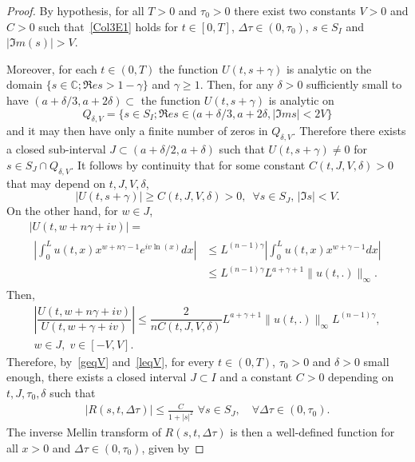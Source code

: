 \documentclass[10pt]{amsart}
\theoremstyle{definition}\newtheorem{defi}[theo]{Definition}\newtheorem{rema}[theo]{Remark}\newtheorem{exam}[theo]{Example}\newtheorem{exem}[theo]{Example}\newtheorem{nota}[theo]{Notation}
\newcommand*\dst{\displaystyle}
\newcommand*\C{\mathbb{C}}
\let\oldforall\forall
\renewcommand*{\forall}{\mathrel{\oldforall}}
\begin{document}
\begin{proof}
By hypothesis, for all $T>0$ and $\tau _0>0$ there exist two constants $V>0$ and $C>0$ such that~\eqref{Col3E1} holds for $t\in [0, T]$, $\Delta \tau \in (0, \tau _0)$, $s\in S_I$ and $|\Im m(s)|>V$. 


Moreover, for each $t\in (0, T)$ the function $U(t, s+\gamma)$ is analytic on the domain $\{s\in \C; \Re e s>1-\gamma\}$ and $\gamma \ge 1$. Then, for any $\delta >0$ sufficiently small to have $(a+\delta/3, a+2\delta)\subset $ the function $U(t, s+\gamma)$ is analytic on
\[
Q_{\delta, V}=\{s\in S_I; \Re e s\in (a+\delta/3, a+2\delta, |\Im m s|<2V\}
\]
and it may then have only a finite number of zeros in $Q_{\delta, V}$. Therefore there exists a closed sub-interval $J\subset (a+\delta /2, a+\delta)$ such that $U(t, s+\gamma)\not =0$ for $s\in S_J\cap Q_{\delta, V}$. It follows by continuity that for some constant $C(t, J, V, \delta)>0$ that may depend on $t, J, V, \delta $,
\begin{equation}\label{prop3E5}
|U(t, s+\gamma)|\ge C(t, J, V, \delta)>0,\,\,\,\forall s\in S_J,\,|\Im s|<V.
\end{equation}
On the other hand, for $w\in J$,
\begin{multline*}
|U(t,w+n\gamma+iv)|=\\
\begin{aligned}
\left| \dst\int_0^{L} u(t,x) x^{w+n\gamma-1}e^{iv\ln(x)}dx \right|
&\leq
L^{(n-1)\gamma} \left| \dst\int_0^{L} u(t,x) x^{w+\gamma- 1}dx \right|
\\
&\leq L^{(n-1)\gamma} L^{a+\gamma+1} \|u(t,.)\|_{\infty}.
\end{aligned}
\end{multline*}
Then,
\begin{multline}\label{leqV}
\left|\dfrac{ U(t,w +n\gamma+ iv)}{ U(t,w +\gamma+ iv)}\right|\leq \dfrac{2}{n C(t, J, V, \delta)}L^{a+\gamma+1} \|u(t,.)\|_{\infty} L^{(n-1)\gamma}, \\
w\in J,\; v\in [-V,V].
\end{multline}
Therefore, by~\eqref{geqV} and~\eqref{leqV}, for every $t\in (0, T)$, $\tau _0 >0$ and $\delta >0$ small enough, there exists a closed interval $J\subset I$ and a constant $C>0$ depending on $t, J, \tau _0, \delta $ such that
\begin{align}\label{prop3E1}
\left|R(s, t, \Delta \tau)\right|\le \frac{C}{1+|s|^2}\,\,\forall s\in S_J,\quad\forall \Delta \tau \in (0, \tau _0).
\end{align}
The inverse Mellin transform of $R(s, t, \Delta \tau)$ is then a well-defined function for all $x>0$ and $\Delta \tau \in (0, \tau _0)$, given by

\end{proof}
\end{document}
